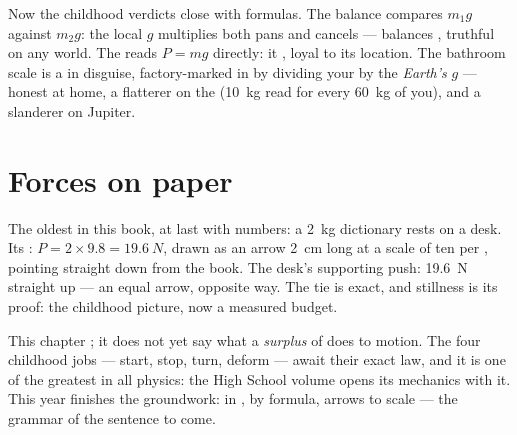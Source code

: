 \begin{remark}\label{rem:g9:weight-vs-mass:scales}
Now the childhood verdicts close with formulas. The balance
compares $m_1 g$ against $m_2 g$: the local $g$ multiplies
both pans and cancels --- balances  \emph{},
truthful on any world. The  reads $P = m g$
directly: it  \emph{}, loyal to its location.
The bathroom scale is a  in disguise,
factory-marked in  by dividing your  by the
\emph{Earth's} $g$ --- honest at home, a flatterer on the
 (\qty{10}{kg} read for every \qty{60}{kg} of you), and
a slanderer on Jupiter.
\end{remark}

\section{Forces on paper}

\begin{example}\label{ex:g9:weight-vs-mass:book}
The oldest  in this book, at last with numbers: a
\qty{2}{kg} dictionary rests on a desk. Its : $P = 2
\times 9.8 = \qty{19.6}{N}$, drawn as an arrow \qty{2}{cm}
long at a scale of ten  per , pointing
straight down from the book. The desk's supporting push:
\qty{19.6}{N} straight up --- an equal arrow, opposite way.
The tie is exact, and stillness is its proof: the childhood
picture, now a measured budget.
\end{example}

\begin{remark}\label{rem:g9:weight-vs-mass:dynamics}
This chapter  ; it does not yet say what a
\emph{surplus} of  does to motion. The four childhood
jobs --- start, stop, turn, deform --- await their exact law,
and it is one of the greatest in all physics: the High School
volume opens its mechanics with it. This year finishes the
groundwork:  in ,  by formula, arrows to
scale --- the grammar of the sentence to come.
\end{remark}

